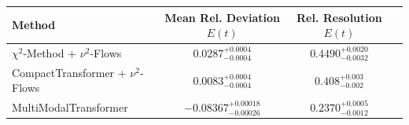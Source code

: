     \begin{tabular}{lccc}
        \toprule
        Method & Mean Rel. Deviation $E(t)$ & Rel. Resolution $E(t)$ \\
        \midrule
        $\chi^2$-Method + $\nu^2$-Flows & $0.0287^{+0.0004}_{-0.0004}$ & $0.4490^{+0.0020}_{-0.0032}$ \\
        CompactTransformer + $\nu^2$-Flows & $0.0083^{+0.0004}_{-0.0004}$ & $0.408^{+0.003}_{-0.002}$ \\
        MultiModalTransformer & $-0.08367^{+0.00018}_{-0.00026}$ & $0.2370^{+0.0005}_{-0.0012}$ \\
        \bottomrule
    \end{tabular}